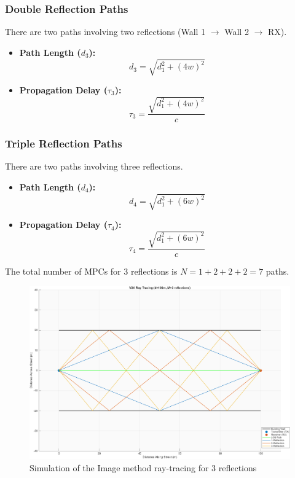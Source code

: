 \subsubsection{Double Reflection Paths}
There are two paths involving two reflections (Wall 1 $\rightarrow$ Wall 2 $\rightarrow$ RX).
\begin{itemize}
	\item \textbf{Path Length ($d_3$):}
	\begin{equation}
		d_3 = \sqrt{d_1^2 + (4w)^2}
	\end{equation}
	\item \textbf{Propagation Delay ($\tau_{3}$):}
	\begin{equation}
		\tau_{3} = \frac{\sqrt{d_1^2 + (4w)^2}}{c}
	\end{equation}
\end{itemize}

\subsubsection{Triple Reflection Paths}
There are two paths involving three reflections.
\begin{itemize}
	\item \textbf{Path Length ($d_4$):}
	\begin{equation}
		d_4 = \sqrt{d_1^2 + (6w)^2}
	\end{equation}
	\item \textbf{Propagation Delay ($\tau_{4}$):}
	\begin{equation}
		\tau_{4} = \frac{\sqrt{d_1^2 + (6w)^2}}{c}
	\end{equation}
\end{itemize}
The total number of MPCs for 3 reflections is $N=1+2+2+2=7$ paths.

\begin{figure}[H]
	\centering
	\includegraphics[width=\linewidth]{content/4-images/ray-tracing-3-reflect}
	\caption{Simulation of the Image method ray-tracing for 3 reflections}
	\label{fig:raytracing-3reflex}
\end{figure}


